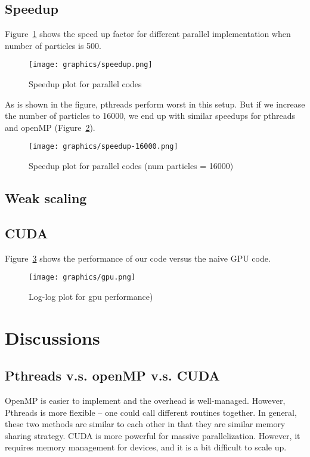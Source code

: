 \documentclass[11pt]{article}
\begin{document}
\subsection{Speedup}
Figure~\ref{fig:speedup} shows the speed up factor for different parallel implementation when number of particles is 500.
\begin{figure}[htb]
  \centering
  \texttt{[image: graphics/speedup.png]}
  \caption{Speedup plot for parallel codes}
  \label{fig:speedup}
\end{figure}

As is shown in the figure, pthreads perform worst in this setup. But if we increase the number of particles to 16000,
we end up with similar speedups for pthreads and openMP (Figure~\ref{fig:speedup-16000}).
\begin{figure}[htb]
  \centering
  \texttt{[image: graphics/speedup-16000.png]}
  \caption{Speedup plot for parallel codes (num particles = 16000)}
  \label{fig:speedup-16000}
\end{figure}

\subsection{Weak scaling}

\subsection{CUDA}
Figure~\ref{fig:gpu} shows the performance of our code versus the naive GPU code.
\begin{figure}[htb]
  \centering
  \texttt{[image: graphics/gpu.png]}
  \caption{Log-log plot for gpu performance)}
  \label{fig:gpu}
\end{figure}

\section{Discussions}
\subsection{Pthreads v.s. openMP v.s. CUDA}
OpenMP is easier to implement and the overhead is well-managed. However, Pthreads is more flexible -- one could call
different routines together. In general, these two methods are similar to each other in that they are similar memory
sharing strategy. CUDA is more powerful for massive parallelization. However, it requires memory management for devices,
and it is a bit difficult to scale up.
\end{document}
